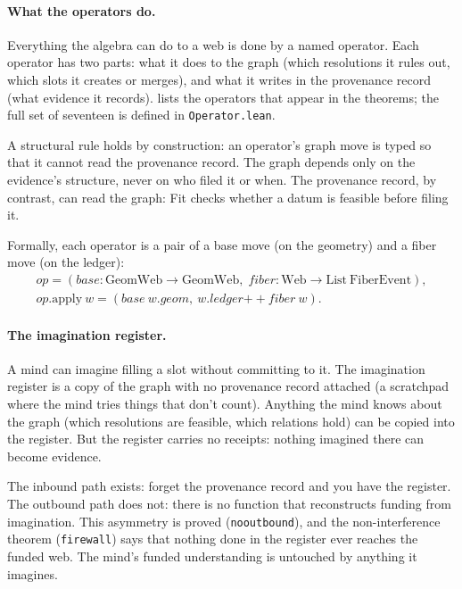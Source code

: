 \documentclass[11pt]{article}
\newcommand{\leanus}{\textunderscore\allowbreak}
\newcommand{\lean}[1]{{\let\_\leanus\texttt{#1}}}
\theoremstyle{remark}
\begin{document}
\paragraph{What the operators do.} Everything the algebra can do to a web is done by a
named operator. Each operator has two parts: what it does to the graph (which resolutions it rules out, which
slots it creates or merges), and what it writes in the provenance record (what evidence it records). 
lists the operators that appear in the theorems; the full set of seventeen is defined in
\lean{Operator.lean}.

A structural rule holds by construction: an operator's graph move is typed so that it
cannot read the provenance record. The graph depends only on the evidence's structure,
never on who filed it or when. The provenance record, by contrast, can read the graph: Fit
checks whether a datum is feasible before filing it.

Formally, each operator is a pair of a base move (on the geometry) and a fiber move (on the
ledger):
\begin{gather*}
  \mathit{op} = (\mathit{base} : \mathrm{GeomWeb} \to \mathrm{GeomWeb},\;
  \mathit{fiber} : \mathrm{Web} \to \mathrm{List}\ \mathrm{FiberEvent}), \\
  \mathit{op}.\mathrm{apply}\ w = (\mathit{base}\ w.\mathit{geom},\
    w.\mathit{ledger} \mathbin{+\!\!+} \mathit{fiber}\ w).
\end{gather*}

\paragraph{The imagination register.} A mind can imagine filling a slot without committing
to it. The imagination register is a copy of the graph with no provenance record attached (a
scratchpad where the mind tries things that don't count). Anything the mind knows about the
graph (which resolutions are feasible, which relations hold) can be copied into the register.
But the register carries no receipts: nothing imagined there can become evidence.

The inbound path exists: forget the provenance record and you have the register. The outbound path
does not: there is no function that reconstructs funding from imagination. This asymmetry
is proved (\lean{no\_outbound}), and the non-interference theorem (\lean{firewall}) says
that nothing done in the register ever reaches the funded web. The mind's funded
understanding is untouched by anything it imagines.
\end{document}
